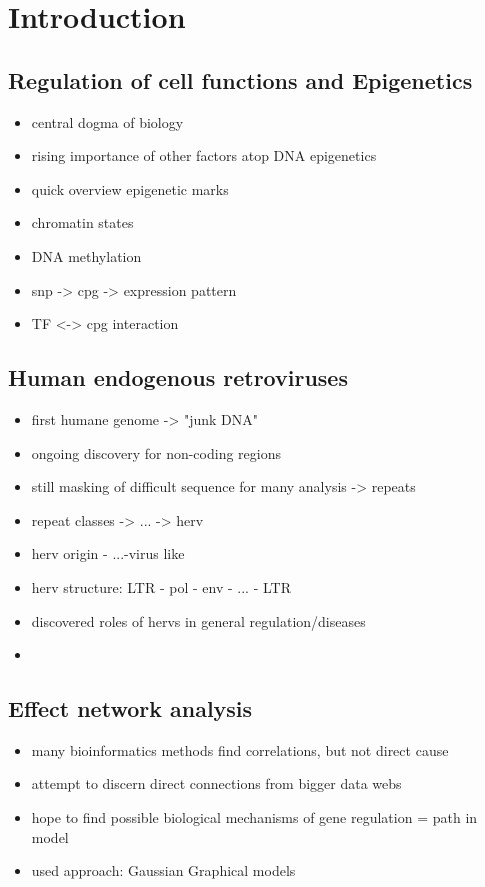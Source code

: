 \documentclass[a4paper,12pt]{article}
\begin{document}
\sectionfont{\LARGE}
\subsectionfont{\Large}
\subsubsectionfont{\Large}

\tableofcontents
\newpage

\section{Introduction}

\subsection{Regulation of cell functions and Epigenetics}
\begin{itemize}
\item central dogma of biology
\item rising importance of other factors atop DNA \textrightarrow epigenetics
\item quick overview epigenetic marks
\item chromatin states
\item DNA methylation 
\item snp -> cpg -> expression pattern
\item TF <-> cpg interaction
\end{itemize}


\subsection{Human endogenous retroviruses}
\begin{itemize}
\item first humane genome -> "junk DNA"
\item ongoing discovery for non-coding regions
\item still masking of difficult sequence for many analysis -> repeats
\item repeat classes -> ... -> herv
\item herv origin - ...-virus like 
\item herv structure: LTR - pol - env - ... - LTR
\item discovered roles of hervs in general regulation/diseases
\item 
\end{itemize}

\subsection{Effect network analysis}
\begin{itemize}
\item many bioinformatics methods find correlations, but not direct cause
\item attempt to discern direct connections from bigger data webs
\item hope to find possible biological mechanisms of gene regulation = path in model
\item used approach: Gaussian Graphical models
\end{itemize}
\end{document}
